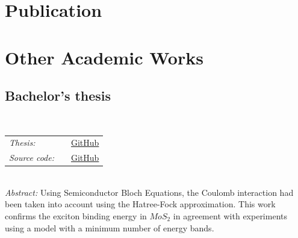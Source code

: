 \documentclass[letterpaper,11pt]{article}
\begin{document}
\section{Publication}
\vspace{3pt}
\section{Other Academic Works}
\subsection*{Bachelor's thesis}
\vspace{-5pt}
\hspace{0.5cm}{Calculation of The Linear-Absorption Spectrum of An Ideal Two-dimensional System of \(MoS_2\)}\\
\hspace{0.6cm}\begin{tabular}{l c r}
	\textit{Thesis: } & \hspace{0.2cm} \null& \href{https://github.com/VCDPhuong/Bachelor-Thesis/blob/37c1b5a46d3f06ed93adcf5fea8482b4f0515b45/20130008_VoChauDucPhuong.pdf}{\faGithub \hspace{.5pt}\color{blue}GitHub}\\
	\textit{Source code:} & & \href{https://github.com/VCDPhuong/Bachelor-Thesis/tree/37c1b5a46d3f06ed93adcf5fea8482b4f0515b45/code}{ \faGithub \hspace{.5pt}\color{blue}GitHub}\\
\end{tabular}\\
\hspace{0.6cm}\textit{Abstract: }Using Semiconductor Bloch Equations, the Coulomb interaction had been taken into account using the Hatree-Fock approximation. This work confirms the exciton binding energy in \(MoS_2\) in agreement with experiments using a model with a minimum number of energy bands.
\end{document}
